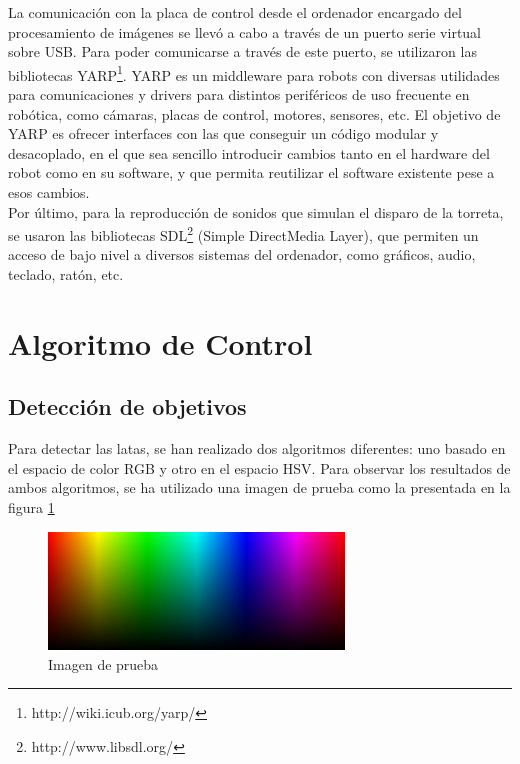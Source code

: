 La comunicación con la placa de control desde el ordenador encargado del procesamiento de imágenes se llevó a cabo a través de un puerto serie virtual sobre USB. Para poder comunicarse a través de este puerto, se utilizaron las bibliotecas YARP\footnote{http://wiki.icub.org/yarp/}. YARP es un middleware para robots con diversas utilidades para comunicaciones y drivers para distintos periféricos de uso frecuente en robótica, como cámaras, placas de control, motores, sensores, etc. El objetivo de YARP es ofrecer interfaces con las que conseguir un código modular y desacoplado, en el que sea sencillo introducir cambios tanto en el hardware del robot como en su software, y que permita reutilizar el software existente pese a esos cambios.\\

Por último, para la reproducción de sonidos que simulan el disparo de la torreta, se usaron las bibliotecas SDL\footnote{http://www.libsdl.org/} (Simple DirectMedia Layer), que permiten un acceso de bajo nivel a diversos sistemas del ordenador, como gráficos, audio, teclado, ratón, etc.\\

\newpage

\section{Algoritmo de Control}
\subsection{Detección de objetivos}
Para detectar las latas, se han realizado dos algoritmos diferentes: uno basado en el espacio de color RGB y otro en el espacio HSV. Para observar los resultados de ambos algoritmos, se ha utilizado una imagen de prueba como la presentada en la figura \ref{imagendeprueba}\\

\begin{figure}[h]
\centering
\includegraphics[width=0.7\textwidth]{images/imagendeprueba}%
\caption{Imagen de prueba}
\label{imagendeprueba}
\end{figure}
\FloatBarrier

